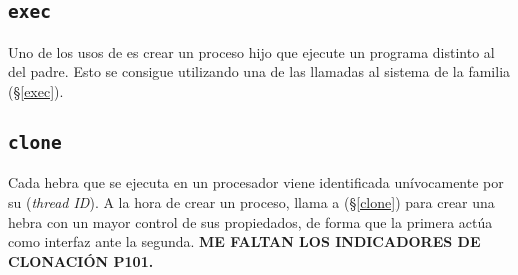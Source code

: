 \subsection{\texttt{exec}}

Uno de los usos de  es crear un proceso hijo que ejecute un programa distinto al del padre.
Esto se consigue utilizando una de las llamadas al sistema de la familia  (\S\ref{exec}).

\subsection{\texttt{clone}}

Cada hebra que se ejecuta en un procesador viene identificada unívocamente por su  (\emph{thread ID}).
A la hora de crear un proceso,  llama a  (\S\ref{clone})  para crear una hebra con un mayor control de sus propiedados, de forma que la primera actúa como interfaz ante la segunda.
\textbf{ME FALTAN LOS INDICADORES DE CLONACIÓN P101.}

